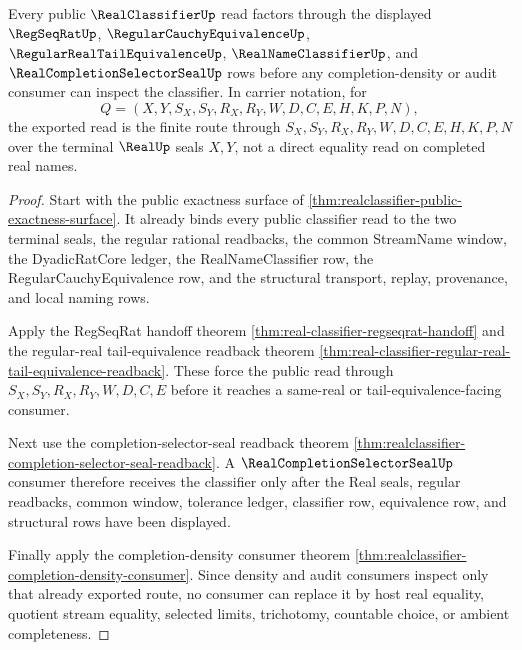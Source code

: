 \begin{theorem}
\label{thm:realclassifier-public-export-readback}
Every public $\RealClassifierUp$ read factors through the displayed $\RegSeqRatUp$, $\RegularCauchyEquivalenceUp$, $\RegularRealTailEquivalenceUp$, $\RealNameClassifierUp$, and $\RealCompletionSelectorSealUp$ rows before any completion-density or audit consumer can inspect the classifier. In carrier notation, for
$$
Q=(X,Y,S_X,S_Y,R_X,R_Y,W,D,C,E,H,K,P,N),
$$
the exported read is the finite route through $S_X,S_Y,R_X,R_Y,W,D,C,E,H,K,P,N$ over the terminal $\RealUp$ seals $X,Y$, not a direct equality read on completed real names.
\end{theorem}
\begin{proof}
Start with the public exactness surface of \autoref{thm:realclassifier-public-exactness-surface}. It already binds every public classifier read to the two terminal seals, the regular rational readbacks, the common StreamName window, the DyadicRatCore ledger, the RealNameClassifier row, the RegularCauchyEquivalence row, and the structural transport, replay, provenance, and local naming rows.

Apply the RegSeqRat handoff theorem \autoref{thm:real-classifier-regseqrat-handoff} and the regular-real tail-equivalence readback theorem \autoref{thm:real-classifier-regular-real-tail-equivalence-readback}. These force the public read through $S_X,S_Y,R_X,R_Y,W,D,C,E$ before it reaches a same-real or tail-equivalence-facing consumer.

Next use the completion-selector-seal readback theorem \autoref{thm:realclassifier-completion-selector-seal-readback}. A $\RealCompletionSelectorSealUp$ consumer therefore receives the classifier only after the Real seals, regular readbacks, common window, tolerance ledger, classifier row, equivalence row, and structural rows have been displayed.

Finally apply the completion-density consumer theorem \autoref{thm:realclassifier-completion-density-consumer}. Since density and audit consumers inspect only that already exported route, no consumer can replace it by host real equality, quotient stream equality, selected limits, trichotomy, countable choice, or ambient completeness.
\end{proof}


